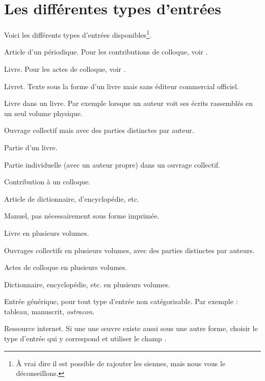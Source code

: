 \section{Les différentes types d'entrées}
Voici les différents types d'entrées disponibles\footnote{À vrai dire il est possible de rajouter les siennes, mais nous vous le déconseillons.}.


\begin{choix}

	\item[\type{article}] 
Article d'un périodique. Pour les contributions de colloque, voir .
	\item[\type{book}] 
Livre. Pour les actes de colloque, voir  . 
	\item[\type{booklet}]
	Livret. Texte sous la forme d'un livre mais sans éditeur commercial officiel.
	\item[\type{bookinbook}]
	Livre dans un livre. Par exemple lorsque un auteur  voit ses écrits rassemblés en un seul volume physique. 	
	\item[\type{collection}]
	Ouvrage collectif mais avec des parties distinctes par auteur.
	\item[\type{inbook}]
	Partie d'un livre.
	\item[\type{incollection}]
	Partie individuelle (avec un auteur propre) dans un ouvrage collectif.
	\item[\type{inproceedings}]
	 Contribution à un colloque.
	 \item[\type{inreference}]
	 Article de dictionnaire, d'encyclopédie, etc.
	\item[\type{manual}]
	 Manuel, pas nécessairement sous forme imprimée.
	 \item[\type{mvbook}]
	 Livre en plusieurs volumes.
	 \item[\type{mvcollection}]
	 Ouvrages collectifs en plusieurs volumes, avec des parties distinctes par auteurs.
	 \item[\type{mvproceedings}]
	 Actes de colloque en plusieurs volumes.
	 \item[\type{mvreference}]
	 Dictionnaire, encyclopédie, etc. en plusieurs volumes.
	\item[\type{misc}]
	 Entrée générique, pour tout type d'entrée non catégorisable. Par exemple : tableau, manuscrit, \emph{ostracon}. 
	\item[\type{online}]
	Ressource internet. Si une une œuvre existe aussi sous une autre forme, choisir le type d'entrée qui y correspond et utiliser le champ .

\end{choix}
